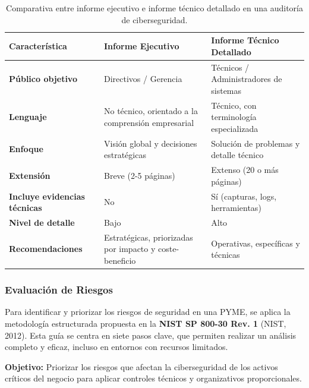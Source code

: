\documentclass[a4paper, 11pt]{article}
\begin{document}
\begin{table}[H]
\centering
\begin{tabular}{|p{4cm}|p{5cm}|p{5cm}|}
\hline
\textbf{Característica} & \textbf{Informe Ejecutivo} & \textbf{Informe Técnico Detallado} \\
\hline
\textbf{Público objetivo} & Directivos / Gerencia & Técnicos / Administradores de sistemas \\
\hline
\textbf{Lenguaje} & No técnico, orientado a la comprensión empresarial & Técnico, con terminología especializada \\
\hline
\textbf{Enfoque} & Visión global y decisiones estratégicas & Solución de problemas y detalle técnico \\
\hline
\textbf{Extensión} & Breve (2-5 páginas) & Extenso (20 o más páginas) \\
\hline
\textbf{Incluye evidencias técnicas} & No & Sí (capturas, logs, herramientas) \\
\hline
\textbf{Nivel de detalle} & Bajo & Alto \\
\hline
\textbf{Recomendaciones} & Estratégicas, priorizadas por impacto y coste-beneficio & Operativas, específicas y técnicas \\
\hline
\end{tabular}
\caption{Comparativa entre informe ejecutivo e informe técnico detallado en una auditoría de ciberseguridad.}
\end{table}






\vspace{0.5cm}

\subsubsection{Evaluación de Riesgos}

Para identificar y priorizar los riesgos de seguridad en una PYME, se aplica la metodología estructurada propuesta en la \textbf{NIST SP 800-30 Rev. 1} (NIST, 2012). Esta guía se centra en siete pasos clave, que permiten realizar un análisis completo y eficaz, incluso en entornos con recursos limitados.

\vspace{0.5cm}

\textbf{Objetivo:} Priorizar los riesgos que afectan la ciberseguridad de los activos críticos del negocio para aplicar controles técnicos y organizativos proporcionales.

\vspace{0.5cm}
\end{document}
